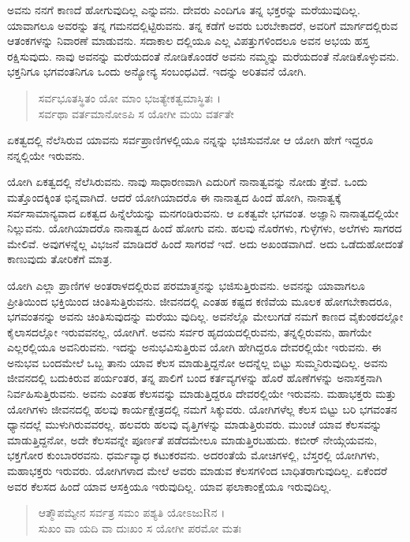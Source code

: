 ಅವನು ನನಗೆ ಕಾಣದೆ ಹೋಗುವುದಿಲ್ಲ ಎನ್ನುವನು. ದೇವರು ಎಂದಿಗೂ ತನ್ನ ಭಕ್ತರನ್ನು ಮರೆಯುವುದಿಲ್ಲ. ಯಾವಾಗಲೂ ಅವರನ್ನು ತನ್ನ ಗಮನದಲ್ಲಿಟ್ಟಿರುವನು. ತನ್ನ ಕಡೆಗೆ ಅವರು ಬರಬೇಕಾದರೆ, ಅವರಿಗೆ ಮಾರ್ಗದಲ್ಲಿರುವ ಆತಂಕಗಳನ್ನು ನಿವಾರಣೆ ಮಾಡುವನು. ಸದಾಕಾಲ ದಲ್ಲಿಯೂ ಎಲ್ಲ ವಿಪತ್ತುಗಳಿಂದಲೂ ಅವನ ಅಭಯ ಹಸ್ತ ರಕ್ಷಿಸುವುದು. ನಾವು ಅವನನ್ನು ಮರೆಯದಂತೆ ನೋಡಿಕೊಂಡರೆ ಅವನು ನಮ್ಮನ್ನು ಮರೆಯದಂತೆ ನೋಡಿಕೊಳ್ಳುವನು. ಭಕ್ತನಿಗೂ ಭಗವಂತನಿಗೂ ಒಂದು ಅನ್ಯೋನ್ಯ ಸಂಬಂಧವಿದೆ. ಇದನ್ನು ಅರಿತವನೆ ಯೋಗಿ.

\begin{verse}
ಸರ್ವಭೂತಸ್ಥಿತಂ ಯೋ ಮಾಂ ಭಜತ್ಯೇಕತ್ವಮಾಸ್ಥಿತಃ ।\\ಸರ್ವಥಾ ವರ್ತಮಾನೋಽಪಿ ಸ ಯೋಗೀ ಮಯಿ ವರ್ತತೇ 
\end{verse}

{\small ಏಕತ್ವದಲ್ಲಿ ನೆಲೆಸಿರುವ ಯಾವನು ಸರ್ವಪ್ರಾಣಿಗಳಲ್ಲಿಯೂ ನನ್ನನ್ನು ಭಜಿಸುವನೋ ಆ ಯೋಗಿ ಹೇಗೆ ಇದ್ದರೂ ನನ್ನಲ್ಲಿಯೇ ಇರುವನು.}

ಯೋಗಿ ಏಕತ್ವದಲ್ಲಿ ನೆಲೆಸಿರುವನು. ನಾವು ಸಾಧಾರಣವಾಗಿ ಎದುರಿಗೆ ನಾನಾತ್ವವನ್ನು ನೋಡು ತ್ತೇವೆ. ಒಂದು ಮತ್ತೊಂದಕ್ಕಿಂತ ಭಿನ್ನವಾಗಿದೆ. ಆದರೆ ಯೋಗಿಯಾದರೊ ಈ ನಾನಾತ್ವದ ಹಿಂದೆ ಹೋಗಿ, ನಾನಾತ್ವಕ್ಕೆ ಸರ್ವಸಾಮಾನ್ಯವಾದ ಏಕತ್ವದ ಹಿನ್ನೆಲೆಯನ್ನು ಮನಗಂಡಿರುವನು. ಆ ಏಕತ್ವವೇ ಭಗವಂತ. ಅಜ್ಞಾನಿ ನಾನಾತ್ವದಲ್ಲಿಯೇ ನಿಲ್ಲುವನು. ಯೋಗಿಯಾದರೊ ನಾನಾತ್ವದ ಹಿಂದೆ ಹೋಗು ವನು. ಹಲವು ನೊರೆಗಳು, ಗುಳ್ಳೆಗಳು, ಅಲೆಗಳು ಸಾಗರದ ಮೇಲಿವೆ. ಅವುಗಳನ್ನೆಲ್ಲ ವಿಭಜನೆ ಮಾಡಿದರೆ ಹಿಂದೆ ಸಾಗರವೆ ಇದೆ. ಅದು ಅಖಂಡವಾಗಿದೆ. ಅದು ಒಡೆದುಹೋದಂತೆ ಕಾಣುವುದು ತೋರಿಕೆಗೆ ಮಾತ್ರ.

ಯೋಗಿ ಎಲ್ಲಾ ಪ್ರಾಣಿಗಳ ಅಂತರಾಳದಲ್ಲಿರುವ ಪರಮಾತ್ಮನನ್ನು ಭಜಿಸುತ್ತಿರುವನು. ಅವನನ್ನು ಯಾವಾಗಲೂ ಪ್ರೀತಿಯಿಂದ ಭಕ್ತಿಯಿಂದ ಚಿಂತಿಸುತ್ತಿರುವನು. ಜೀವನದಲ್ಲಿ ಎಂತಹ ಕಷ್ಟದ ಕಣಿವೆಯ ಮೂಲಕ ಹೋಗಬೇಕಾದರೂ, ಭಗವಂತನನ್ನು ಅವನು ಚಿಂತಿಸುವುದನ್ನು ಮರೆಯು ವುದಿಲ್ಲ. ಅವನೆಲ್ಲೊ ಮೇಲುಗಡೆ ನಮಗೆ ಕಾಣದ ವೈಕುಂಠದಲ್ಲೋ ಕೈಲಾಸದಲ್ಲೋ ಇರುವವನಲ್ಲ, ಯೋಗಿಗೆ. ಅವನು ಸರ್ವರ ಹೃದಯದಲ್ಲಿರುವನು, ತನ್ನಲ್ಲಿರುವನು, ಹಾಗೆಯೇ ಎಲ್ಲರಲ್ಲಿಯೂ ಅವನಿರುವನು. ಇದನ್ನು ಅನುಭವಿಸುತ್ತಿರುವ ಯೋಗಿ ಹೇಗಿದ್ದರೂ ದೇವರಲ್ಲಿಯೇ ಇರುವನು. ಈ ಅನುಭವ ಬಂದಮೇಲೆ ಒಬ್ಬ ತಾನು ಯಾವ ಕೆಲಸ ಮಾಡುತ್ತಿದ್ದನೋ ಅದನ್ನೆಲ್ಲ ಬಿಟ್ಟು ಸುಮ್ಮನಿರುವುದಿಲ್ಲ. ಅವನು ಜೀವನದಲ್ಲಿ ಬದುಕಿರುವ ಪರ್ಯಂತರ, ತನ್ನ ಪಾಲಿಗೆ ಬಂದ ಕರ್ತವ್ಯಗಳನ್ನು ಹೊರೆ ಹೊಣೆಗಳನ್ನು ಅನಾಸಕ್ತನಾಗಿ ನಿರ್ವಹಿಸುತ್ತಿರುವನು. ಅವನು ಎಂತಹ ಕೆಲಸವನ್ನು ಮಾಡುತ್ತಿದ್ದರೂ ದೇವರಲ್ಲಿಯೇ ಇರುವನು. ಮಹಾಭಕ್ತರು ಮತ್ತು ಯೋಗಿಗಳು ಜೀವನದಲ್ಲಿ ಹಲವು ಕಾರ್ಯಕ್ಷೇತ್ರದಲ್ಲಿ ನಮಗೆ ಸಿಕ್ಕುವರು. ಯೋಗಿಗಳೆಲ್ಲ ಕೆಲಸ ಬಿಟ್ಟು ಬರಿ ಭಗವಂತನ ಧ್ಯಾನದಲ್ಲೆ ಮುಳುಗಿರುವವರಲ್ಲ. ಹಲವರು ಹಲವು ವೃತ್ತಿಗಳನ್ನು ಮಾಡುತ್ತಿರುವರು. ಮುಂಚೆ ಯಾವ ಕೆಲಸವನ್ನು ಮಾಡುತ್ತಿದ್ದನೋ, ಅದೇ ಕೆಲಸವನ್ನೇ ಪೂರ್ಣತೆ ಪಡೆದಮೇಲೂ ಮಾಡುತ್ತಿರಬಹುದು. ಕಬೀರ್ ನೇಯ್ಗೆಯವನು, ಭಕ್ತಗೋರ ಕುಂಬಾರರವನು. ಧರ್ಮವ್ಯಾಧ ಕಟುಕರವನು. ಅದರಂತೆಯೆ ಮೋಚಿಗಳಲ್ಲಿ, ಬೆಸ್ತರಲ್ಲಿ ಯೋಗಿಗಳು, ಮಹಾಭಕ್ತರು ಇರುವರು. ಯೋಗಿಗಳಾದ ಮೇಲೆ ಅವರು ಮಾಡುವ ಕೆಲಸಗಳಿಂದ ಬಾಧಿತರಾಗುವುದಿಲ್ಲ. ಏಕೆಂದರೆ ಅವರ ಕೆಲಸದ ಹಿಂದೆ ಯಾವ ಆಸಕ್ತಿಯೂ ಇರುವುದಿಲ್ಲ. ಯಾವ ಫಲಾಕಾಂಕ್ಷೆಯೂ ಇರುವುದಿಲ್ಲ.

\begin{verse}
ಆತ್ಮೌಪಮ್ಯೇನ ಸರ್ವತ್ರ ಸಮಂ ಪಶ್ಯತಿ ಯೋಽಜುRನ ।\\ಸುಖಂ ವಾ ಯದಿ ವಾ ದುಃಖಂ ಸ ಯೋಗೀ ಪರಮೋ ಮತಃ 
\end{verse}

